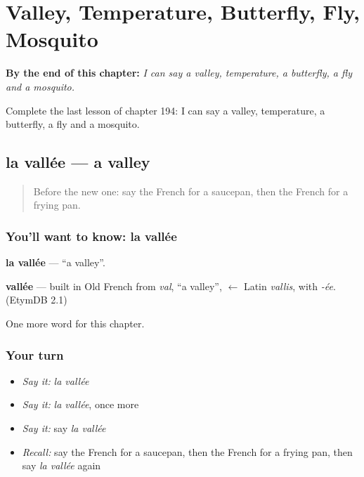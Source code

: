 
\chapter{Valley, Temperature, Butterfly, Fly, Mosquito}
\label{ch:fr-valley-temperature-butterfly-fly-mosquito}

\begin{chapteropening}
\textbf{By the end of this chapter:} \emph{I can say a valley, temperature, a butterfly, a fly and a mosquito.}

Complete the last lesson of chapter 194: I can say a valley, temperature, a butterfly, a fly and a mosquito.
\end{chapteropening}

\section[la vallée]{la vallée — a valley}

\label{lesson:FR-C194-vallee}



\begin{quote}
Before the new one: say the French for a saucepan, then the French for a frying pan.
\end{quote}

\subsection*{You'll want to know: la vallée}
\textbf{la vallée} — \textquotedblleft{}a valley\textquotedblright{}.

\begin{cousinweb}
\textbf{vallée} — built in Old French from \emph{val}, \textquotedblleft{}a valley\textquotedblright{}, $\leftarrow$ Latin \emph{vallis}, with \emph{-ée}. (EtymDB 2.1)
\end{cousinweb}

\begin{grammarlens}[title={What you've built}]
One more word for this chapter.
\end{grammarlens}

\subsection*{Your turn}
\begin{itemize}
\raggedright
  \item \emph{Say it:} \emph{la vallée}
  \item \emph{Say it:} \emph{la vallée}, once more
  \item \emph{Say it:} say \emph{la vallée}
  \item \emph{Recall:} say the French for a saucepan, then the French for a frying pan, then say \emph{la vallée} again
\end{itemize}

